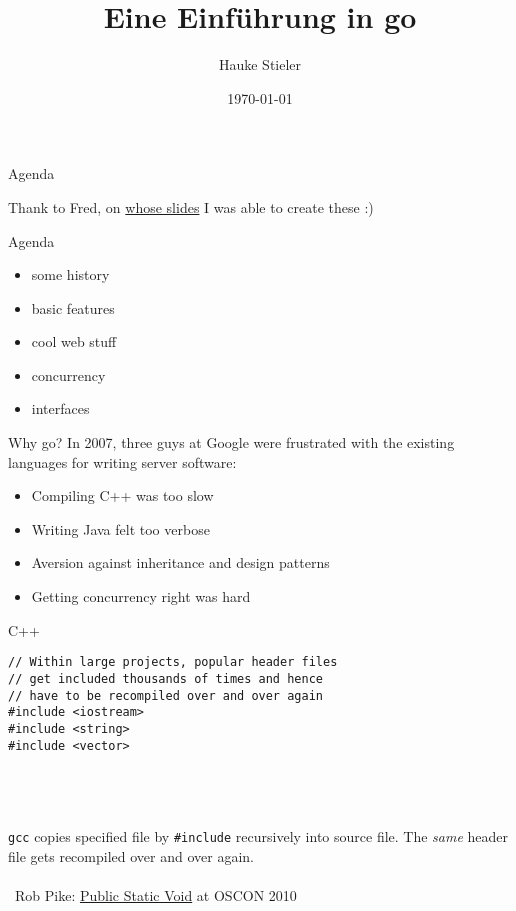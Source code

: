 \documentclass[10pt]{beamer}
\author{Hauke Stieler}
\title{Eine Einführung in go}
\date{\footnotesize \today}
\institute{Fachbereich Informatik der Universität Hamburg}\titlegraphic{\hfill\texttt{[image: images/gopher\\inv]}}
\begin{document}
	\maketitle
	
	
	\begin{frame}{Agenda}
		\begin{center}
			Thank to Fred, on \href{https://github.com/frectures/go}{whose slides} I was able to create these :)
		\end{center}
	\end{frame}
	
	
	\begin{frame}{Agenda}
		\begin{itemize}
			\item some history
			\item basic features
			\item cool web stuff
			\item concurrency
			\item interfaces
		\end{itemize}
	\end{frame}


	\begin{frame}{Why go?}
		In 2007, three guys at Google were frustrated with the existing languages for writing server software:
		\begin{itemize}
			\item Compiling C++ was too slow
			\item Writing Java felt too verbose
			\item Aversion against inheritance and design patterns
			\item Getting concurrency right was hard
		\end{itemize}
	\end{frame}


	\begin{frame}[t,fragile]{C++}
		\begin{verbatim}
// Within large projects, popular header files
// get included thousands of times and hence
// have to be recompiled over and over again
#include <iostream>
#include <string>
#include <vector>
		\end{verbatim}
		\\\\\\
		\pause
		\texttt{gcc} copies specified file by \texttt{#include} recursively into source file. The \textit{same} header file gets recompiled over and over again.\\
		\hfill\\
		\textrightarrow ~Rob Pike: \href{https://www.youtube.com/watch?v=5kj5ApnhPAE}{Public Static Void} at OSCON 2010
\end{frame}
\end{document}
